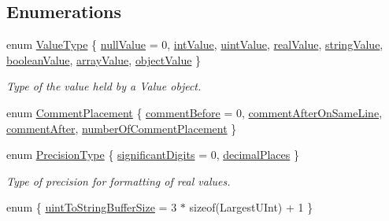 \subsection*{Enumerations}
\begin{DoxyCompactItemize}
\item 
enum \hyperlink{namespaceJson_a7d654b75c16a57007925868e38212b4e}{Value\+Type} \{ \newline
\hyperlink{namespaceJson_a7d654b75c16a57007925868e38212b4ea7d9899633b4409bd3fc107e6737f8391}{null\+Value} = 0, 
\hyperlink{namespaceJson_a7d654b75c16a57007925868e38212b4eae5a9d708d5c9e23ae9bf98898522512d}{int\+Value}, 
\hyperlink{namespaceJson_a7d654b75c16a57007925868e38212b4eaea788d9a3bb00adc6d68d97d43e1ccd3}{uint\+Value}, 
\hyperlink{namespaceJson_a7d654b75c16a57007925868e38212b4eab837c7b869c14d8be712deb45c9e490e}{real\+Value}, 
\newline
\hyperlink{namespaceJson_a7d654b75c16a57007925868e38212b4ea804ef857affea2d415843c73f261c258}{string\+Value}, 
\hyperlink{namespaceJson_a7d654b75c16a57007925868e38212b4ea14c30dbf4da86f7b809be299f671f7fd}{boolean\+Value}, 
\hyperlink{namespaceJson_a7d654b75c16a57007925868e38212b4eadc8f264f36b55b063c78126b335415f4}{array\+Value}, 
\hyperlink{namespaceJson_a7d654b75c16a57007925868e38212b4eae8386dcfc36d1ae897745f7b4f77a1f6}{object\+Value}
 \}\begin{DoxyCompactList}\small\item\em Type of the value held by a Value object. \end{DoxyCompactList}
\item 
enum \hyperlink{namespaceJson_a4fc417c23905b2ae9e2c47d197a45351}{Comment\+Placement} \{ \hyperlink{namespaceJson_a4fc417c23905b2ae9e2c47d197a45351a52f1733775460517b2ea6bedf4906d52}{comment\+Before} = 0, 
\hyperlink{namespaceJson_a4fc417c23905b2ae9e2c47d197a45351a008a230a0586de54f30b76afe70fdcfa}{comment\+After\+On\+Same\+Line}, 
\hyperlink{namespaceJson_a4fc417c23905b2ae9e2c47d197a45351ac5784ca53b12250888ddb642b06aebef}{comment\+After}, 
\hyperlink{namespaceJson_a4fc417c23905b2ae9e2c47d197a45351abcbd3eb00417335e094e4a03379659b5}{number\+Of\+Comment\+Placement}
 \}
\item 
enum \hyperlink{namespaceJson_af6e1447a3c43e3a62e11050dd0a11ce8}{Precision\+Type} \{ \hyperlink{namespaceJson_af6e1447a3c43e3a62e11050dd0a11ce8abb30ddeaa820d370a2438dda7a08996a}{significant\+Digits} = 0, 
\hyperlink{namespaceJson_af6e1447a3c43e3a62e11050dd0a11ce8aaee1bf0411c550a0bb2996b7b67cae87}{decimal\+Places}
 \}\begin{DoxyCompactList}\small\item\em Type of precision for formatting of real values. \end{DoxyCompactList}
\item 
enum \{ \hyperlink{namespaceJson_a2aacab54ef6fc18e833fbd4982a0a23aae4f2008c7919f20d81286121d1374424}{uint\+To\+String\+Buffer\+Size} = 3 $\ast$ sizeof(Largest\+U\+Int) + 1
 \}
\end{DoxyCompactItemize}
